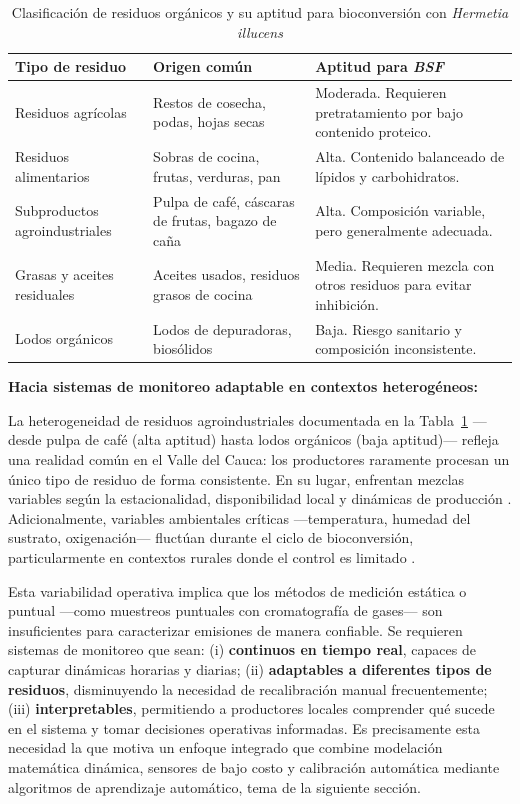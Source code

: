 \begin{table}[H]
\centering
\caption{Clasificación de residuos orgánicos y su aptitud para bioconversión con \textit{Hermetia illucens}}
\label{tab:residuos_BSF}
\begin{tabular}{|p{4cm}|p{5cm}|p{5cm}|}
\hline
\textbf{Tipo de residuo} & \textbf{Origen común} & \textbf{Aptitud para \textit{BSF}} \\ \hline
Residuos agrícolas & Restos de cosecha, podas, hojas secas & Moderada. Requieren pretratamiento por bajo contenido proteico. \\ \hline
Residuos alimentarios & Sobras de cocina, frutas, verduras, pan & Alta. Contenido balanceado de lípidos y carbohidratos. \\ \hline
Subproductos agroindustriales & Pulpa de café, cáscaras de frutas, bagazo de caña & Alta. Composición variable, pero generalmente adecuada. \\ \hline
Grasas y aceites residuales & Aceites usados, residuos grasos de cocina & Media. Requieren mezcla con otros residuos para evitar inhibición. \\ \hline
Lodos orgánicos & Lodos de depuradoras, biosólidos & Baja. Riesgo sanitario y composición inconsistente. \\ \hline
\end{tabular}
\end{table}

\textbf{Hacia sistemas de monitoreo adaptable en contextos heterogéneos:}

La heterogeneidad de residuos agroindustriales documentada en la Tabla~\ref{tab:residuos_BSF} 
—desde pulpa de café (alta aptitud) hasta lodos orgánicos (baja aptitud)— refleja una realidad 
común en el Valle del Cauca: los productores raramente procesan un único tipo de residuo de forma 
consistente. En su lugar, enfrentan mezclas variables según la estacionalidad, disponibilidad local 
y dinámicas de producción \parencite{elsayedConversionProteinrichWaste2024a,brunoValorizationOrganicWaste2025}. 
Adicionalmente, variables ambientales críticas —temperatura, humedad del sustrato, oxigenación— 
fluctúan durante el ciclo de bioconversión, particularmente en contextos rurales donde el control 
es limitado \parencite{bekkerImpactSubstrateMoisture2021a,rossiEstimatingDynamicsGreenhouse2024a}. 

Esta variabilidad operativa implica que los métodos de medición estática o puntual —como 
muestreos puntuales con cromatografía de gases— son insuficientes para caracterizar emisiones 
de manera confiable. Se requieren sistemas de monitoreo que sean: (i) \textbf{continuos en tiempo 
real}, capaces de capturar dinámicas horarias y diarias; (ii) \textbf{adaptables a diferentes tipos 
de residuos}, disminuyendo la necesidad de recalibración manual frecuentemente; (iii) \textbf{interpretables}, 
permitiendo a productores locales comprender qué sucede en el sistema y tomar decisiones operativas 
informadas. Es precisamente esta necesidad la que motiva un enfoque integrado que combine 
modelación matemática dinámica, sensores de bajo costo y calibración automática mediante algoritmos 
de aprendizaje automático, tema de la siguiente sección.

